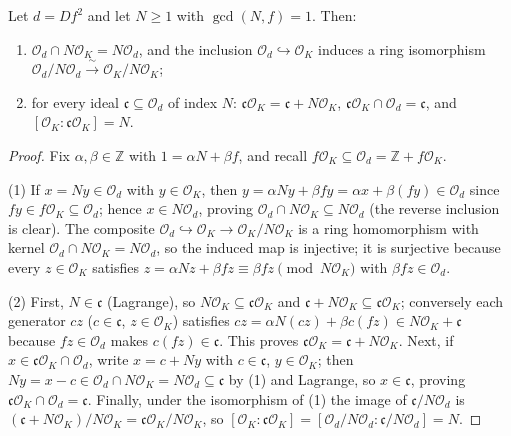 \begin{lemma}
  \label{infra-glue-avoid}
  Let $d = Df^2$ and let $N \geq 1$ with $\gcd(N, f) = 1$. Then:
  \begin{enumerate}
    \item $\mathcal{O}_d \cap N\mathcal{O}_K = N\mathcal{O}_d$, and the
      inclusion $\mathcal{O}_d \hookrightarrow \mathcal{O}_K$ induces a ring
      isomorphism
      $\mathcal{O}_d/N\mathcal{O}_d \xrightarrow{\ \sim\ }
       \mathcal{O}_K/N\mathcal{O}_K$;
    \item for every ideal $\mathfrak{c} \subseteq \mathcal{O}_d$ of index $N$:
      $\mathfrak{c}\mathcal{O}_K = \mathfrak{c} + N\mathcal{O}_K$,
      \quad
      $\mathfrak{c}\mathcal{O}_K \cap \mathcal{O}_d = \mathfrak{c}$,
      \quad and \quad
      $[\mathcal{O}_K : \mathfrak{c}\mathcal{O}_K] = N$.
  \end{enumerate}
\end{lemma}

\begin{proof}
  Fix $\alpha, \beta \in \mathbb{Z}$ with $1 = \alpha N + \beta f$, and recall
  $f\mathcal{O}_K \subseteq \mathcal{O}_d = \mathbb{Z} + f\mathcal{O}_K$.

  (1) If $x = Ny \in \mathcal{O}_d$ with $y \in \mathcal{O}_K$, then
  $y = \alpha Ny + \beta fy = \alpha x + \beta(fy) \in \mathcal{O}_d$ since
  $fy \in f\mathcal{O}_K \subseteq \mathcal{O}_d$; hence
  $x \in N\mathcal{O}_d$, proving
  $\mathcal{O}_d \cap N\mathcal{O}_K \subseteq N\mathcal{O}_d$ (the reverse
  inclusion is clear). The composite
  $\mathcal{O}_d \hookrightarrow \mathcal{O}_K \to
  \mathcal{O}_K/N\mathcal{O}_K$ is a ring homomorphism with kernel
  $\mathcal{O}_d \cap N\mathcal{O}_K = N\mathcal{O}_d$, so the induced map is
  injective; it is surjective because every $z \in \mathcal{O}_K$ satisfies
  $z = \alpha Nz + \beta fz \equiv \beta fz \pmod{N\mathcal{O}_K}$ with
  $\beta fz \in \mathcal{O}_d$.

  (2) First, $N \in \mathfrak{c}$ (Lagrange), so
  $N\mathcal{O}_K \subseteq \mathfrak{c}\mathcal{O}_K$ and
  $\mathfrak{c} + N\mathcal{O}_K \subseteq \mathfrak{c}\mathcal{O}_K$;
  conversely each generator $cz$ ($c \in \mathfrak{c}$, $z \in \mathcal{O}_K$)
  satisfies $cz = \alpha N(cz) + \beta c(fz) \in N\mathcal{O}_K + \mathfrak{c}$
  because $fz \in \mathcal{O}_d$ makes $c(fz) \in \mathfrak{c}$. This proves
  $\mathfrak{c}\mathcal{O}_K = \mathfrak{c} + N\mathcal{O}_K$.
  Next, if $x \in \mathfrak{c}\mathcal{O}_K \cap \mathcal{O}_d$, write
  $x = c + Ny$ with $c \in \mathfrak{c}$, $y \in \mathcal{O}_K$; then
  $Ny = x - c \in \mathcal{O}_d \cap N\mathcal{O}_K = N\mathcal{O}_d
  \subseteq \mathfrak{c}$ by (1) and Lagrange, so $x \in \mathfrak{c}$, proving
  $\mathfrak{c}\mathcal{O}_K \cap \mathcal{O}_d = \mathfrak{c}$.
  Finally, under the isomorphism of (1) the image of
  $\mathfrak{c}/N\mathcal{O}_d$ is
  $(\mathfrak{c} + N\mathcal{O}_K)/N\mathcal{O}_K =
  \mathfrak{c}\mathcal{O}_K/N\mathcal{O}_K$, so
  $[\mathcal{O}_K : \mathfrak{c}\mathcal{O}_K] =
   [\mathcal{O}_d/N\mathcal{O}_d : \mathfrak{c}/N\mathcal{O}_d] = N$.
\end{proof}

